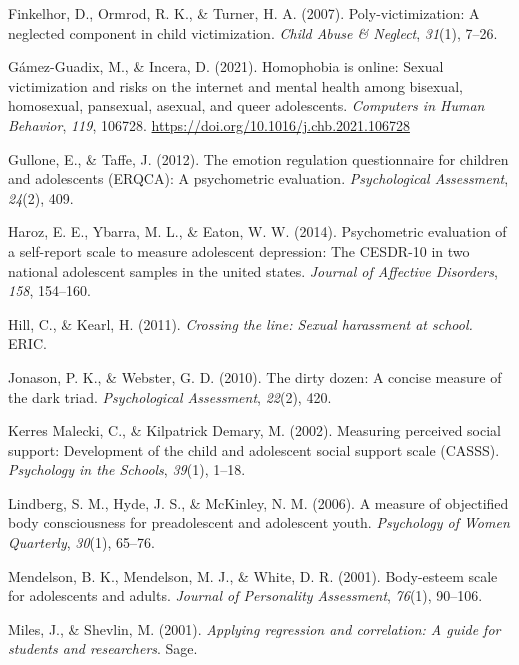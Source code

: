 \documentclass[
]{article}
\newlength{\cslhangindent}
\newenvironment{CSLReferences}[2] %
 {\begin{list}{}{%
  \setlength{\itemindent}{0pt}
  \setlength{\leftmargin}{0pt}
  \setlength{\parsep}{0pt}
  \ifodd #1
   \setlength{\leftmargin}{\cslhangindent}
   \setlength{\itemindent}{-1\cslhangindent}
  \fi
  \setlength{\itemsep}{#2\baselineskip}}}
 {\end{list}}
\begin{document}
\begin{CSLReferences}{1}{0}
Finkelhor, D., Ormrod, R. K., \& Turner, H. A. (2007).
Poly-victimization: A neglected component in child victimization.
\emph{Child Abuse \& Neglect}, \emph{31}(1), 7--26.

Gámez-Guadix, M., \& Incera, D. (2021). Homophobia is online: Sexual
victimization and risks on the internet and mental health among
bisexual, homosexual, pansexual, asexual, and queer adolescents.
\emph{Computers in Human Behavior}, \emph{119}, 106728.
\url{https://doi.org/10.1016/j.chb.2021.106728}

Gullone, E., \& Taffe, J. (2012). The emotion regulation questionnaire
for children and adolescents (ERQ{\textendash}CA): A psychometric
evaluation. \emph{Psychological Assessment}, \emph{24}(2), 409.

Haroz, E. E., Ybarra, M. L., \& Eaton, W. W. (2014). Psychometric
evaluation of a self-report scale to measure adolescent depression: The
CESDR-10 in two national adolescent samples in the united states.
\emph{Journal of Affective Disorders}, \emph{158}, 154--160.

Hill, C., \& Kearl, H. (2011). \emph{Crossing the line: Sexual
harassment at school.} ERIC.

Jonason, P. K., \& Webster, G. D. (2010). The dirty dozen: A concise
measure of the dark triad. \emph{Psychological Assessment},
\emph{22}(2), 420.

Kerres Malecki, C., \& Kilpatrick Demary, M. (2002). Measuring perceived
social support: Development of the child and adolescent social support
scale (CASSS). \emph{Psychology in the Schools}, \emph{39}(1), 1--18.

Lindberg, S. M., Hyde, J. S., \& McKinley, N. M. (2006). A measure of
objectified body consciousness for preadolescent and adolescent youth.
\emph{Psychology of Women Quarterly}, \emph{30}(1), 65--76.

Mendelson, B. K., Mendelson, M. J., \& White, D. R. (2001). Body-esteem
scale for adolescents and adults. \emph{Journal of Personality
Assessment}, \emph{76}(1), 90--106.

Miles, J., \& Shevlin, M. (2001). \emph{Applying regression and
correlation: A guide for students and researchers}. Sage.


\end{CSLReferences}
\end{document}
